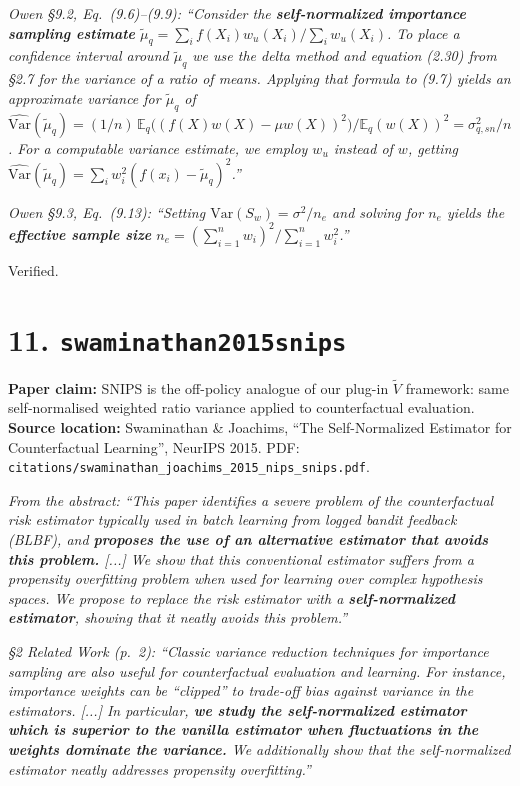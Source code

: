 \documentclass[11pt]{article}
\newcommand{\paperclaim}[1]{\textbf{Paper claim:} #1}
\newcommand{\source}[1]{\textbf{Source location:} #1}
\newcommand{\quoted}[1]{\begin{tcolorbox}\textit{#1}\end{tcolorbox}}
\begin{document}
\quoted{Owen \S9.2, Eq.~(9.6)--(9.9): ``Consider the \textbf{self-normalized
importance sampling estimate}
$\tilde\mu_q = \sum_i f(X_i)w_u(X_i) / \sum_i w_u(X_i)$. To place a
confidence interval around $\tilde\mu_q$ we use the delta method and
equation (2.30) from \S2.7 for the variance of a ratio of means. Applying
that formula to (9.7) yields an approximate variance for $\tilde\mu_q$ of
$\widehat{\mathrm{Var}}(\tilde\mu_q) = (1/n)\,\mathbb E_q\bigl((f(X)w(X)-\mu w(X))^2\bigr)
/ \mathbb E_q(w(X))^2 = \sigma^2_{q,sn}/n$. For a computable variance
estimate, we employ $w_u$ instead of $w$, getting
$\widehat{\mathrm{Var}}(\tilde\mu_q) = \sum_i w_i^2 (f(x_i)-\tilde\mu_q)^2$.''}

\quoted{Owen \S9.3, Eq.~(9.13): ``Setting $\mathrm{Var}(S_w) = \sigma^2/n_e$
and solving for $n_e$ yields the \textbf{effective sample size}
$n_e = (\sum_{i=1}^n w_i)^2 / \sum_{i=1}^n w_i^2$.''}

\noindent Verified.

\bigskip

\section*{11. \texttt{swaminathan2015snips}}
\paperclaim{SNIPS is the off-policy analogue of our plug-in $\widetilde V$
framework: same self-normalised weighted ratio variance applied to
counterfactual evaluation.}\\
\source{Swaminathan \& Joachims, ``The Self-Normalized Estimator for
Counterfactual Learning'', NeurIPS 2015. PDF:
\texttt{citations/swaminathan\_joachims\_2015\_nips\_snips.pdf}.}

\quoted{From the abstract: ``This paper identifies a severe problem of the
counterfactual risk estimator typically used in batch learning from
logged bandit feedback (BLBF), and \textbf{proposes the use of an
alternative estimator that avoids this problem.} [...] We show that this
conventional estimator suffers from a \emph{propensity overfitting}
problem when used for learning over complex hypothesis spaces. We
propose to replace the risk estimator with a \textbf{self-normalized
estimator}, showing that it neatly avoids this problem.''}

\quoted{\S2 Related Work (p.~2): ``Classic variance reduction techniques
for importance sampling are also useful for counterfactual evaluation and
learning. For instance, importance weights can be ``clipped'' to trade-off
bias against variance in the estimators. [...] In particular, \textbf{we
study the self-normalized estimator which is superior to the vanilla
estimator when fluctuations in the weights dominate the variance.} We
additionally show that the self-normalized estimator neatly addresses
propensity overfitting.''}
\end{document}
